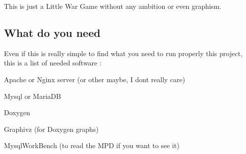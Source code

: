 This is just a Little War Game without any ambition or even graphism.

\subsection*{What do you need}

Even if this is really simple to find what you need to run properly this project, this is a list of needed software \+:


\begin{DoxyEnumerate}
\item Apache or Nginx server (or other maybe, I don\textquotesingle{}t really care)
\item Mysql or Maria\+DB
\item Doxygen
\item Graphivz (for Doxygen graphs)
\item Mysql\+Work\+Bench (to read the M\+PD if you want to see it) 
\end{DoxyEnumerate}